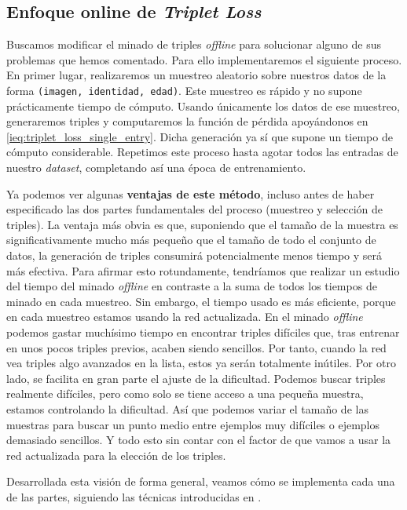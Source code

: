 \subsection{Enfoque online de \textit{Triplet Loss}} \label{isubs:triples_online}

Buscamos modificar el minado de triples \textit{offline} para solucionar alguno de sus problemas que hemos comentado. Para ello implementaremos el siguiente proceso. En primer lugar, realizaremos un muestreo aleatorio sobre nuestros datos de la forma \lstinline{(imagen, identidad, edad)}. Este muestreo es rápido y no supone prácticamente tiempo de cómputo. Usando únicamente los datos de ese muestreo, generaremos triples y computaremos la función de pérdida apoyándonos en \eqref{ieq:triplet_loss_single_entry}. Dicha generación ya sí que supone un tiempo de cómputo considerable. Repetimos este proceso hasta agotar todos las entradas de nuestro \textit{dataset}, completando así una época de entrenamiento.

Ya podemos ver algunas \textbf{ventajas de este método}, incluso antes de haber especificado las dos partes fundamentales del proceso (muestreo y selección de triples). La ventaja más obvia es que, suponiendo que el tamaño de la muestra es significativamente mucho más pequeño que el tamaño de todo el conjunto de datos, la generación de triples consumirá potencialmente menos tiempo y será más efectiva. Para afirmar esto rotundamente, tendríamos que realizar un estudio del tiempo del minado \textit{offline} en contraste a la suma de todos los tiempos de minado en cada muestreo. Sin embargo, el tiempo usado es más eficiente, porque en cada muestreo estamos usando la red actualizada. En el minado \textit{offline} podemos gastar muchísimo tiempo en encontrar triples difíciles que, tras entrenar en unos pocos triples previos, acaben siendo sencillos. Por tanto, cuando la red vea triples algo avanzados en la lista, estos ya serán totalmente inútiles. Por otro lado, se facilita en gran parte el ajuste de la dificultad. Podemos buscar triples realmente difíciles, pero como solo se tiene acceso a una pequeña muestra, estamos controlando la dificultad. Así que podemos variar el tamaño de las muestras para buscar un punto medio entre ejemplos muy difíciles o ejemplos demasiado sencillos. Y todo esto sin contar con el factor de que vamos a usar la red actualizada para la elección de los triples.

Desarrollada esta visión de forma general, veamos cómo se implementa cada una de las partes, siguiendo las técnicas introducidas en \cite{informatica:principal}.

